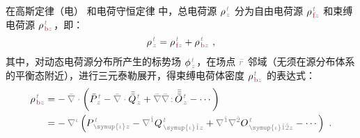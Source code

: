 在高斯定律（电）  和电荷守恒定律  中，总电荷源 ${\rho}^{\;\!\mathcolor{gray}{t}}_{\;\!\mathcolor{gray}{z}}$ 分为自由电荷源 ${\rho}^{\;\!\mathcolor{gray}{t}}_{\;\!\textcolor{Maroon}{\text{f}}\mathcolor{gray}{z}}$ 和束缚电荷源 ${\rho}^{\;\!\mathcolor{gray}{t}}_{\;\!\textcolor{Maroon}{\text{b}}\mathcolor{gray}{z}}$\cite{langeMultipoleTheoryHehl2015,raabMultipoleTheoryElectromagnetism2004}，即：
\abovedisplayskip=10pt
\belowdisplayskip=10pt
\begin{align} \label{eq:p=f+b}
	{\rho}^{\;\!\mathcolor{gray}{t}}_{\;\!\mathcolor{gray}{z}} = {\rho}^{\;\!\mathcolor{gray}{t}}_{\;\!\textcolor{Maroon}{\text{f}}\mathcolor{gray}{z}} + {\rho}^{\;\!\mathcolor{gray}{t}}_{\;\!\textcolor{Maroon}{\text{b}}\mathcolor{gray}{z}}~,
\end{align}
其中，对动态电荷源分布所产生的标势场 $\phi^{\;\!\mathcolor{gray}{t}}_{\;\!\mathcolor{gray}{z}}$，在场点 $\mathcolor{gray}{\bar{r}}$ 邻域（无须在源分布体系的平衡态附近），进行三元泰勒展开，得束缚电荷体密度 ${\rho}^{\;\!\mathcolor{gray}{t}}_{\;\!\textcolor{Maroon}{\text{b}}\mathcolor{gray}{z}}$ 的表达式\cite{raabMultipoleTheoryElectromagnetism2004,delangeTranslationalInvariancePost2012,chen-zhuChenZhuxieUndergraduate_courses2024}：
\begin{subequations}
\begin{align}
	{\rho}^{\;\!\mathcolor{gray}{t}}_{\;\!\textcolor{Maroon}{\text{b}}\mathcolor{gray}{z}} &= -\hspace{0.2em} \mathcolor{gray}{\bar{\nabla} \cdot} \left( \bar{P}^{\;\!\mathcolor{gray}{t}}_{\;\!\mathcolor{gray}{z}} - \mathcolor{gray}{\bar{\nabla} \cdot} \bar{\bar{Q}}^{\;\!\mathcolor{gray}{t}}_{\;\!\mathcolor{gray}{z}} + \mathcolor{gray}{\bar{\nabla}} \mathcolor{gray}{\bar{\nabla} \colon}\! \bar{\bar{\bar{O}}}^{\;\!\mathcolor{gray}{t}}_{\;\!\mathcolor{gray}{z}} - \cdots \right) \label{eq:P-b} \\
	&= -\hspace{0.2em} \mathcolor{gray}{\nabla^\iota} \left( P^{\;\!\mathcolor{gray}{t}}_{\;\! \mathcolor{gray}{\symup{\iota}} \mathcolor{gray}{z}} - \mathcolor{gray}{\nabla^{\hat{1}}} Q^{\;\!\mathcolor{gray}{t}}_{\;\! \mathcolor{gray}{\symup{\iota} \hat{1}} \mathcolor{gray}{z}} + \mathcolor{gray}{\nabla^{\hat{1}}} \mathcolor{gray}{\nabla^{\hat{2}}} O^{\;\!\mathcolor{gray}{t}}_{\;\! \mathcolor{gray}{\symup{\iota} \hat{1} \hat{2}} \mathcolor{gray}{z}} - \cdots \right)~. \label{eq:p-b}
\end{align}
\end{subequations}

